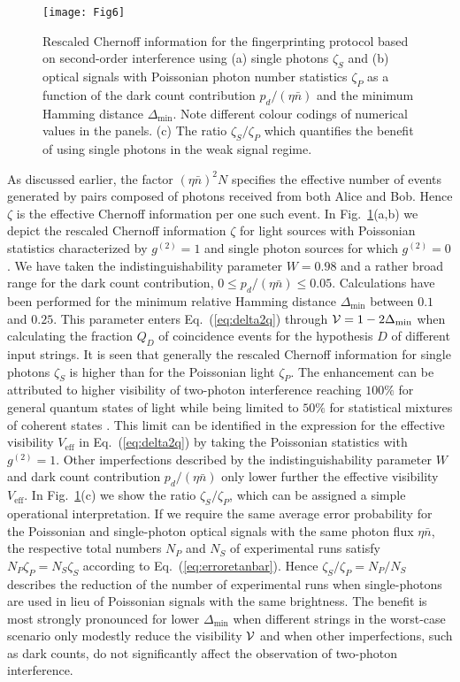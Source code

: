 \documentclass[10pt]{article}
\begin{document}
\begin{figure}
\texttt{[image: Fig6]}\centering\caption{Rescaled Chernoff information for the fingerprinting protocol based on second-order interference using (a) single photons $\zeta_S$ and (b) optical signals with Poissonian photon number statistics $\zeta_P$ as a function of the dark count contribution $p_d/(\eta\bar{n})$ and the minimum Hamming distance $\Delta_{\text{min}}$. Note different colour codings of numerical values in the panels. (c) The ratio $\zeta_{S}/\zeta_{P}$ which quantifies the benefit of using single photons in the weak signal regime. \label{fig:Rescaled-Chernoff-information}}
\end{figure}


As discussed earlier, the factor $(\eta\bar{n})^{2}N$ specifies the effective number of events generated by pairs composed of photons received from both Alice and Bob. Hence $\zeta$ is the effective Chernoff information per one such event. In Fig.~\ref{fig:Rescaled-Chernoff-information}(a,b) we depict the rescaled Chernoff information $\zeta$ for  light sources with Poissonian statistics characterized by $g^{(2)}=1$ and single photon sources for which $g^{(2)}=0$. We have taken the indistinguishability parameter $W=0.98$ and a rather broad range for the dark count contribution, $0 \le p_d/(\eta\bar{n}) \le 0.05$. Calculations have been performed for the minimum relative Hamming distance $\Delta_{\text{min}}$  between $0.1$ and $0.25$. This parameter enters Eq.~(\ref{eq:delta2q}) through ${\cal V} = 1-2\Delta_{\text{min}}$ when calculating the fraction $Q_D$ of coincidence events for the hypothesis $D$ of different input strings. It is seen that generally the rescaled Chernoff information for single photons $\zeta_S$ is higher than for the Poissonian light $\zeta_P$. The enhancement can be attributed to higher visibility of two-photon interference reaching $100\%$ for general quantum states of light while being limited to $50\%$ for statistical mixtures of coherent states \cite{Wodkiewicz}. This limit can be identified in the expression for the effective visibility $V_{\text{eff}}$ in Eq.~(\ref{eq:delta2q}) by taking the Poissonian statistics with $g^{(2)} = 1$. Other imperfections described by the indistinguishability parameter $W$ and dark count contribution $p_d/(\eta\bar{n})$ only lower further the effective visibility $V_{\text{eff}}$. In Fig.~\ref{fig:Rescaled-Chernoff-information}(c) we show
the ratio $\zeta_S/\zeta_P$, which can be assigned a simple operational interpretation. If we require the same average error probability for the Poissonian and single-photon optical signals with the same photon flux $\eta\bar{n}$, the respective total numbers $N_P$ and $N_S$ of experimental runs satisfy $N_P\zeta_P  = N_S \zeta_S $ according to Eq.~(\ref{eq:erroretanbar}). Hence $\zeta_S/\zeta_P= N_P/N_S$ describes the reduction of the number of experimental runs when single-photons are used in lieu of Poissonian signals with the same brightness. The benefit is most strongly pronounced for lower $\Delta_{\text{min}}$ when different strings in the worst-case scenario only modestly reduce the visibility ${\cal V}$ and when other imperfections, such as dark counts, do not significantly affect the observation of two-photon interference.
\end{document}
